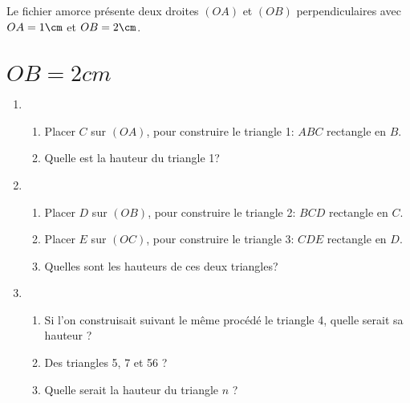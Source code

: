 \def\theme{Activités géométriques : Hauteurs et Triangles}
\def\date{04/11/2023}
\vspace*{-1cm}
\vspace*{0.2cm}

\newcommand*{\tri}[4]{
    \item Placer $#4$ sur $(O#2)$, pour construire le triangle #1: $#2#3#4$ rectangle en $#3$.
}

Le fichier amorce présente deux droites $(OA)$ et $(OB)$ perpendiculaires avec $OA=1\cm$ et $OB=2\cm$.
\vspace*{-0.2cm}
\section{$OB = 2cm$}
\begin{enumerate}\setlength{\itemsep}{15pt}%
    \item \begin{enumerate}
        \tri{1}{A}{B}{C}

        \item Quelle est la hauteur du triangle 1?
    \end{enumerate}
    \item \begin{enumerate}
        \tri{2}{B}{C}{D}
        \tri{3}{C}{D}{E}
        \item Quelles sont les hauteurs de ces deux triangles?
        
    \end{enumerate}
    \item \begin{enumerate}
        \item Si l'on construisait suivant le même procédé le triangle 4,
        quelle serait sa hauteur ? 
        \item Des triangles 5, 7 et 56 ?
        \item Quelle serait la hauteur du triangle $n$ ?
    \end{enumerate}
\end{enumerate}

